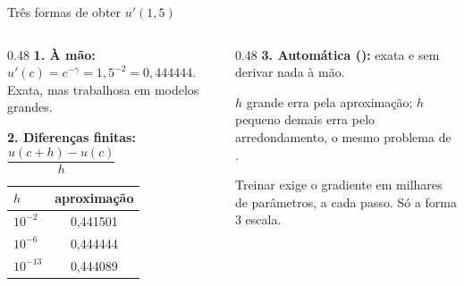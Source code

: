 \documentclass[aspectratio=169,11pt]{beamer}
\begin{document}
\begin{frame}{Três formas de obter $u'(1{,}5)$}
  \begin{columns}[T]
    \begin{column}{0.48\textwidth}
      \textbf{1. À mão:} $u'(c) = c^{-\gamma} = 1{,}5^{-2} = 0{,}444444$.
      Exata, mas trabalhosa em modelos grandes.
      \smallskip

      \textbf{2. Diferenças finitas:} $\dfrac{u(c+h) - u(c)}{h}$
      \par\smallskip\centering\small
      \begin{tabular}{@{}lc@{}}
        \toprule
        $h$ & aproximação \\
        \midrule
        $10^{-2}$  & 0,441501 \\
        $10^{-6}$  & 0,444444 \\
        $10^{-13}$ & 0,444089 \\
        \bottomrule
      \end{tabular}
    \end{column}
    \begin{column}{0.48\textwidth}
      \textbf{3. Automática ():} exata e sem derivar nada à mão.
      \smallskip
      \begin{atencao}
        \small $h$ grande erra pela aproximação; $h$ pequeno demais erra pelo
        arredondamento, o mesmo problema de .
      \end{atencao}
      \begin{intuicao}
        \small Treinar exige o gradiente em milhares de parâmetros, a cada
        passo. Só a forma 3 escala.
      \end{intuicao}
    \end{column}
  \end{columns}
\end{frame}
\end{document}
